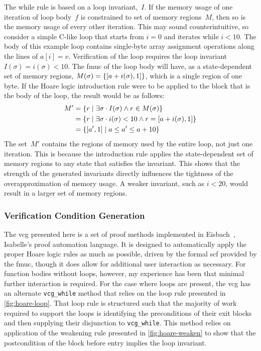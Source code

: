 The while rule is based on a loop invariant,~$I$.
If the memory usage of one iteration of loop body~$f$
is constrained to set of memory regions~$M$,
then so is the memory usage of every other iteration.
This may sound counterintuitive,
so consider a simple C-like loop that starts from $i=0$ and iterates while $i<10$.
The body of this example loop contains single-byte array assignment operations
along the lines of $a[i]=v$.
Verification of the loop requires the loop invariant $I(\sigma)=i(\sigma)<10$.
The \ac{fmuc} of the loop body will have, as a state-dependent set of memory regions, $M(\sigma)=\{[a+i(\sigma),1]\}$, which is a single region of one byte.
If the Hoare logic introduction rule were to be applied to the block
that is the body of the loop, the result would be as follows:
\begin{subequations}
  \begin{align}
    M' &= \{r\mid\exists\sigma\cdot I(\sigma)\wedge r\in M(\sigma)\} \\
    &= \{r\mid\exists\sigma\cdot i(\sigma)<10\wedge r=[a+i(\sigma),1]\} \\
    &= \{[a',1]\mid a\leq a'\le a+10\}
  \end{align}
\end{subequations}
The set~$M'$ contains the regions of memory used by the entire loop,
not just one iteration.
This is because the introduction rule applies the state-dependent set of memory regions
to any state that satisfies the invariant.
This shows that the strength of the generated invariants directly influences the tightness of the overapproximation of memory usage.
A weaker invariant, such as $i<20$, would result in a larger set of memory regions.

\subsubsection{Verification Condition Generation}\label{sse:vcg}
The \ac{vcg} presented here is a set of proof methods
implemented in Eisbach~\citep{matichuk2016eisbach},%
Isabelle's proof automation language.
It is designed to automatically apply the proper Hoare logic rules
as much as possible,
driven by the formal \ac{scf} provided by the \ac{fmuc},
though it does allow for additional user interaction as necessary.
For function bodies without loops,
however, my experience has been that minimal further interaction is required.
For the case where loops are present,
the \ac{vcg} has an alternate \lstinline|vcg_while| method
that relies on the loop rule presented in \cref{fig:hoare-loop}.
That loop rule is structured such that
the majority of work required to support the loops
is identifying the preconditions of their exit blocks
and then supplying their disjunction to \lstinline|vcg_while|.
This method relies on application of the weakening rule
presented in \cref{fig:hoare-weaken}
to show that the postcondition of the block before entry implies the loop invariant.

